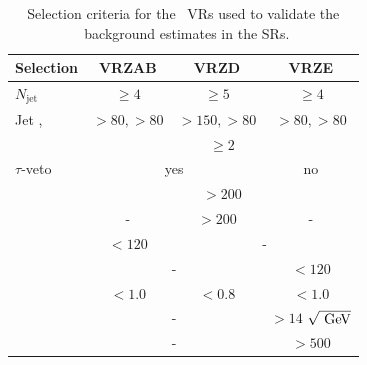 		\begin{table}[htpb]
		  \caption{Selection criteria for the \Zboson\ \acp{VR} used
		    to validate the \Zboson\ background estimates in the \acp{SR}.} 
		  \begin{center}
		    \def\arraystretch{1.4}
		    \begin{tabular}{lccc}
		      \toprule
		      \textbf{Selection}           & \textbf{VRZAB}                    & \textbf{VRZD}           & \textbf{VRZE}          \\
		      \toprule
		      $N_{\mathrm{jet}}$     & $\ge4$                   & $\ge5$         & $\ge4$        \\
		      Jet \ptzero, \ptone & $>80, >80 $ \GeV            & $>150, >80 $ \GeV & $>80, >80 $ \GeV \\
		      \nBJet              & \multicolumn{3}{c}{$ \ge2 $}                              \\ \midrule
		      $\tau$-veto         & \multicolumn{2}{c}{yes} & no                             \\ \midrule
		      \mtbmin             & \multicolumn{3}{c}{$>200$ \gev}                            \\
		      \mtbmax             & -                        & $>200$ \gev     & -             \\
		      \mantikttwelvezero  & $ <120 $ \gev             & \multicolumn{2}{c}{-}          \\
		      \mantikteightzero   & \multicolumn{2}{c}{-}   & $ <120 $ \gev                   \\ \midrule
		      \drbb               & $<1.0$                   & $<0.8$         & $<1.0$        \\
		      \htsig              & \multicolumn{2}{c}{-}   & $>14$ $\sqrt{\gev}$            \\
		      \HT                 & \multicolumn{2}{c}{-}   & $>500$ \gev                     \\ \bottomrule
		    \end{tabular}
		  \end{center}
		  \label{tab:selectionVRZs}
		\end{table}



